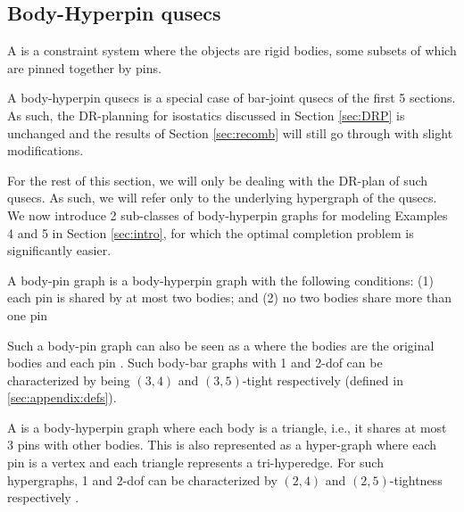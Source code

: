 \subsection{Body-Hyperpin qusecs}


\begin{definition}
    A  is a constraint system where the objects are rigid bodies, some subsets of which are pinned together by pins.
\end{definition}

\begin{remark*}\label{rem:bodypin_is_barjoint}
    A body-hyperpin qusecs is a special case of bar-joint qusecs of the first 5 sections. As such, the DR-planning for isostatics discussed in Section \ref{sec:DRP} is unchanged and the results of Section \ref{sec:recomb} will still go through with slight modifications.
\end{remark*}

For the rest of this section, we will only be dealing with the DR-plan of such qusecs. As such, we will refer only to the underlying hypergraph of the qusecs. We now introduce 2 sub-classes of body-hyperpin graphs for modeling Examples 4 and 5 in Section \ref{sec:intro}, for which the optimal completion problem is significantly easier.

\begin{definition}\label{def:body-pin}
    A body-pin graph is a body-hyperpin graph with the following conditions:
    (1) each pin is shared by at most two bodies; and
    (2) no two bodies share more than one pin

    Such a body-pin graph can also be seen as a  where the bodies  are the original bodies  and each pin  .
    Such body-bar graphs with 1 and 2-dof can be characterized by being $(3,4)$ and $(3,5)$-tight respectively \cite{Lee:2007:PGA} \cite{streinu2009sparse} (defined in \ref{sec:appendix:defs}). 
\end{definition}

\begin{definition}
    A  is a body-hyperpin graph where each body is a triangle, i.e., it shares at most 3 pins with other bodies. This is also represented as a hyper-graph where each pin is a vertex and each triangle represents a tri-hyperedge. For such hypergraphs, 1 and 2-dof can be characterized by $(2,4)$ and $(2,5)$-tightness respectively \cite{Lee:2007:PGA} \cite{streinu2009sparse}.
\end{definition}

